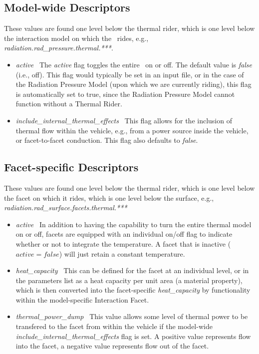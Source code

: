 \subsection{Model-wide Descriptors}
These values are found one level below the thermal rider, which is one level
below the interaction model on which the \ThermalRiderDesc\ rides, e.g.,
\textit{radiation.rad\_pressure.thermal.***}.

\begin{itemize}
\item{\textit{active}}\ \newline
The \textit{active} flag toggles the entire \ThermalRiderDesc\ on or off.  The default value is \textit{false} (i.e., off).  This flag would typically be set in an input file, or in the case of the Radiation Pressure Model (upon which we are currently riding), this flag is automatically set to true, since the Radiation Pressure Model cannot function without a Thermal Rider.  
\item{\textit{include\_internal\_thermal\_effects}}\ \newline
This flag allows for the inclusion of thermal flow within the vehicle, e.g., from a power source inside the vehicle, or facet-to-facet conduction.  This flag also defaults to \textit{false}.
\end{itemize}

\subsection{Facet-specific Descriptors}
These values are found one level below the thermal rider, which is one level
below the facet on which it rides, which is one level below the surface, e.g.,
\textit{radiation.rad\_surface.facets.thermal.***}
\begin{itemize}
\item{\textit{active}}\ \newline
In addition to having the capability to turn the entire thermal model on or off, facets are equipped with an individual on/off flag to indicate whether or not to integrate the temperature.  A facet that is inactive ($active = false$) will just retain a constant temperature.
\item{\textit{heat\_capacity}}\ \newline
This can be defined for the facet at an individual level, or in the parameters list as a heat capacity per unit area (a material property), which is then converted into the facet-specific \textit{heat\_capacity} by functionality within the model-specific Interaction Facet.
\item{\textit{thermal\_power\_dump}}\ \newline
This value allows some level of thermal power to be transfered to the facet from within the vehicle if the model-wide \textit{include\_internal\_thermal\_effects} flag is set.  A positive value represents flow into the facet, a negative value represents flow out of the facet.
\end{itemize}


